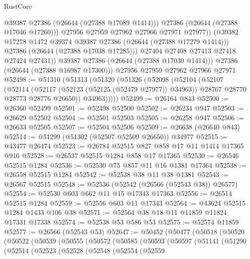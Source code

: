 \begin{lexlean}{RustCore}
\begin{coremodule}
                      @39387
                      @27386
                      (@26644 (@27388 @17089 @1414)))
                    @27386
                    (@26644 (@27388 @17046 @17260)))
                  @27956
                  @27959
                  @27962
                  @27966
                  @27971
                  @27977))
              (@39382 @17278 @1472 @39374 @39387 @27386 (@26644 (@27388 @17279 @1414)))
              @27386
              (@26644 (@27388 @17038 @17285)))
            @27404
            @27408
            @27413
            @27418
            @27424
            @27431))
        @39387
        @27386
        (@26644 (@27388 @17030 @1414)))
      @27386
      (@26644 (@27388 @16987 @17300)))
    @27956
    @27959
    @27962
    @27966
    @27971
@52498 := @51310
    (@51313
      (@51320
        (@51326
          (@52098
            (@52104
              (@52107
                (@52114
                  (@52117 (@52123 (@52125 (@52479 @27977)) @34963))
                  @28767
                  @28770
                  @28773
                  @28776
                  @26650))
              @34963)))))
@52499 := @26164 @843
@52500 := @26360 @52499
@52501 := @52498 @52500
@52502 := @26234 @947
@52503 := @26629 @52502
@52504 := @52501 @52503
@52505 := @26258 @947
@52506 := @26633 @52505
@52507 := @52504 @52506
@52509 := @26638 (@26640 @843)
@52514 := @51299 (@51302 (@52507 @52509 @26650)) @34977
@52515 := @43477 @26474
@52523 := @26784 @52515 @827 @858 @17 @11 @1414 @17365 @916
@52528 := @26537 @52515 @1284 @858 @17 @17365
@52530 := @26546 @52515 @1284
@52536 := @52530 @75 @857 @11 @16 @1381 @17364
@52538 := @26558 @52515 @1284
@52542 := @52538 @38 @11 @38 @1381
@52543 := @26567 @52515
@52548 := @52536 (@52542 (@26566 (@52543 @38)) @26577)
@52554 := @52530 @603 @662 @11 @15 @17343 @17363
@52556 := @26514 @52515 @1284
@52559 := @52556 @603 @11 @17343
@52564 := @43624 @52515 @1284 @1433 @106 @38
@52571 := @52564 @38 @18 @11 @11859 @11824 @17331 @17338
@52574 := @52538 @53 @586 @53
@52575 := @52574 @11859
@52577 := @26566 (@52543 @53)
@52647 := @50452
    (@50477
      (@50518
        (@50520
          (@50522
            (@50539
              (@50555
                (@50572
                  (@50585
                    (@50593
                      (@50597
                        (@51141
                          (@51290
                            (@52514
                              (@52523
                                (@52528
                                  (@52548
                                    (@52554
                                      (@52559

\end{coremodule}
\end{lexlean}
